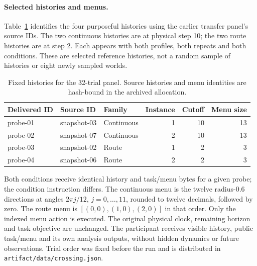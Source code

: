 \paragraph{Selected histories and menus.}
Table~\ref{tab:common-menu-histories} identifies the four purposeful
histories using the earlier transfer panel's source IDs. The two
continuous histories are at physical step 10; the two route histories
are at step 2. Each appears with both profiles, both repeats and both
conditions. These are selected reference histories, not a random sample
of histories or eight newly sampled worlds.

\begin{table}[htbp]
\centering\small
\begin{tabular}{lllrrr}\toprule
Delivered ID & Source ID & Family & Instance & Cutoff & Menu size\\\midrule
probe-01 & snapshot-03 & Continuous & 1 & 10 & 13\\
probe-02 & snapshot-07 & Continuous & 2 & 10 & 13\\
probe-03 & snapshot-02 & Route & 1 & 2 & 3\\
probe-04 & snapshot-06 & Route & 2 & 2 & 3\\\bottomrule
\end{tabular}
\caption{Fixed histories for the 32-trial panel. Source histories and
menu identities are hash-bound in the archived allocation.}
\label{tab:common-menu-histories}
\end{table}

Both conditions receive identical history and task/menu bytes for a
given probe; the condition instruction differs. The continuous menu
is the twelve radius-$0.6$ directions at angles $2\pi j/12$,
$j=0,\ldots,11$, rounded to twelve decimals, followed by zero.
The route menu is $[(0,0),(1,0),(2,0)]$ in that order. Only the indexed
menu action is executed. The original physical clock, remaining
horizon and task objective are unchanged. The participant receives
visible history, public task/menu and its own analysis outputs, without
hidden dynamics or future observations. Trial order was fixed before
the run and is distributed in \texttt{artifact/data/crossing.json}.

